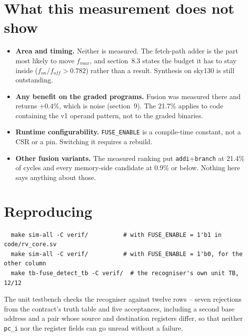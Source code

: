 \documentclass[11pt]{article}
\begin{document}
\section{What this measurement does not show}

\begin{itemize}
\item \textbf{Area and timing.} Neither is measured. The fetch-path adder is the part most
likely to move $f_{max}$, and section~8.3 states the budget it has to stay inside
($f_{on}/f_{off} > 0.782$) rather than a result. Synthesis on sky130 is still outstanding.
\item \textbf{Any benefit on the graded programs.} Fusion was measured there and returns
$+0.4$\%, which is noise (section~9). The 21.7\% applies to code containing the v1 operand
pattern, not to the graded binaries.
\item \textbf{Runtime configurability.} \texttt{FUSE\_ENABLE} is a compile-time constant, not
a CSR or a pin. Switching it requires a rebuild.
\item \textbf{Other fusion variants.} The measured ranking put \texttt{addi}+\texttt{branch}
at 21.4\% of cycles and every memory-side candidate at 0.9\% or below. Nothing here says
anything about those.
\end{itemize}

\section{Reproducing}

\begin{verbatim}
  make sim-all -C verif/          # with FUSE_ENABLE = 1'b1 in code/rv_core.sv
  make sim-all -C verif/          # with FUSE_ENABLE = 1'b0, for the other column
  make tb-fuse_detect_tb -C verif/  # the recogniser's own unit TB, 12/12
\end{verbatim}

The unit testbench checks the recogniser against twelve rows -- seven rejections from the
contract's truth table and five acceptances, including a second base address and a pair whose
source and destination registers differ, so that neither \texttt{pc\_i} nor the register
fields can go unread without a failure.
\end{document}
